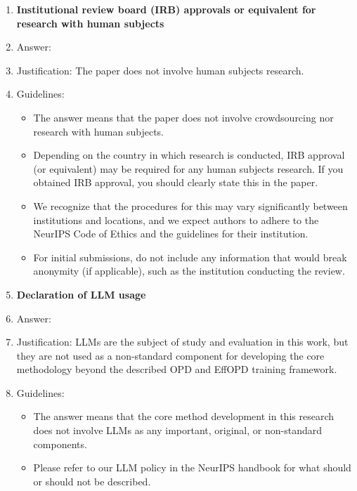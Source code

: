 \documentclass{article}
\begin{document}
\begin{enumerate}
\item {\bf Institutional review board (IRB) approvals or equivalent for research with human subjects}
    \item[] Answer: \answerNA{}
    \item[] Justification: The paper does not involve human subjects research.
    \item[] Guidelines:
    \begin{itemize}
        \item The answer \answerNA{} means that the paper does not involve crowdsourcing nor research with human subjects.
        \item Depending on the country in which research is conducted, IRB approval (or equivalent) may be required for any human subjects research. If you obtained IRB approval, you should clearly state this in the paper. 
        \item We recognize that the procedures for this may vary significantly between institutions and locations, and we expect authors to adhere to the NeurIPS Code of Ethics and the guidelines for their institution. 
        \item For initial submissions, do not include any information that would break anonymity (if applicable), such as the institution conducting the review.
    \end{itemize}
\item {\bf Declaration of LLM usage}
    \item[] Answer: \answerNA{}
    \item[] Justification: LLMs are the subject of study and evaluation in this work, but they are not used as a non-standard component for developing the core methodology beyond the described OPD and EffOPD training framework.
    \item[] Guidelines:
    \begin{itemize}
        \item The answer \answerNA{} means that the core method development in this research does not involve LLMs as any important, original, or non-standard components.
        \item Please refer to our LLM policy in the NeurIPS handbook for what should or should not be described.
    \end{itemize}
\end{enumerate}
\end{document}
